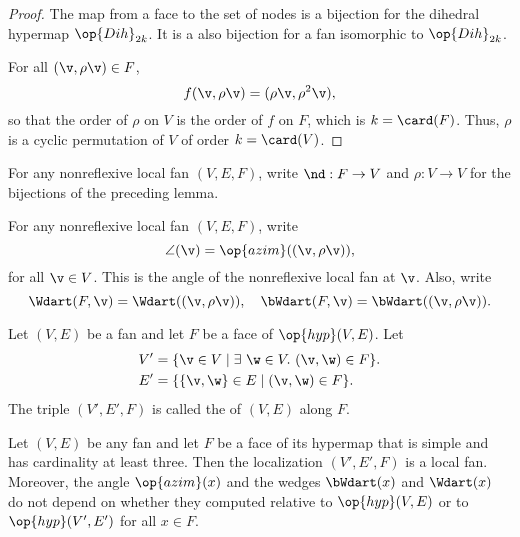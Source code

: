 \begin{proof} The map from a face to the set of nodes is a bijection
  for the dihedral hypermap $\op{Dih}_{2k}$. It is a also bijection
  for a fan isomorphic to $\op{Dih}_{2k}$.

For all $(\v,\rho \v)\in F$,
\[ 
f(\v,\rho \v) = (\rho\v,\rho^2\v),
\] 
so that the order of $\rho$ on $V$ is the order of $f$ on $F$, which
is $k=\card(F)$.  Thus, $\rho$ is a cyclic permutation of $V$ of order
$k=\card(V)$.
\end{proof}

\begin{definition}[$\rho$,~$\nd$] 
For any nonreflexive local fan $(V,E,F)$, write
$\nd:F\to V$ and $\rho:V\to V$ for the bijections of the preceding
lemma.
\end{definition}
%
%

\begin{definition}
For any nonreflexive local fan $(V,E,F)$,
write
\[ 
\angle(\v) = \op{azim}((\v,\rho\v)),
\] 
for all $\v\in V$.  This is the  angle of the
nonreflexive local fan at $\v$.  Also, write
\[ 
  \Wdart(F,\v) = \Wdart((\v,\rho \v)),\quad 
\bWdart(F,\v) =\bWdart((\v,\rho \v)).
\] 
%
%
%
\end{definition}


\begin{definition}[localization]
 Let $(V,E)$ be a fan and let $F$ be
a face of $\op{hyp}(V,E)$.  Let
\begin{align*}
V' &= \{\v\in V \mid \exists~\w\in V.~(\v,\w)\in F\}.\\
E' &= \{\{\v,\w\} \in E\mid (\v,\w)\in F\}.
\end{align*}
The triple $(V',E',F)$ is called the  of $(V,E)$ along $F$.
\end{definition}
%


\begin{lemma}[localization]%
\label{lemma:localization}
Let $(V,E)$ be any fan and let $F$ be a face of its hypermap that is
simple and has cardinality at least three.  Then the localization
$(V',E',F)$ is a local fan.  Moreover, the angle $\op{azim}(x)$ and
the wedges $\bWdart(x)$ and $\Wdart(x)$ do not depend on whether they
computed relative to $\op{hyp}(V,E)$ or to $\op{hyp}(V',E')$ for all
$x\in F$.
\end{lemma}



